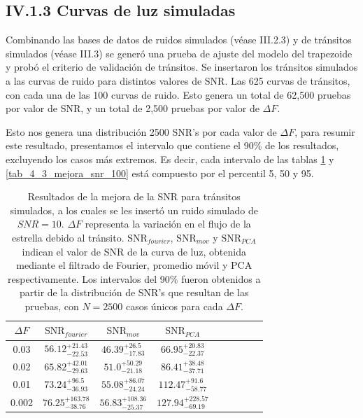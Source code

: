\subsection*{IV.1.3 Curvas de luz simuladas}

Combinando las bases de datos de ruidos simulados (véase III.2.3) y de tránsitos simulados (véase III.3) se generó una prueba de ajuste del modelo del trapezoide y probó el criterio de validación de tránsitos. Se insertaron los tránsitos simulados a las curvas de ruido para distintos valores de SNR. Las 625 curvas de tránsitos, con cada una de las 100 curvas de ruido. Esto genera un total de 62,500 pruebas por valor de SNR, y un total de 2,500 pruebas por valor de $\Delta F$.

Esto nos genera una distribución 2500 SNR's por cada valor de $\Delta F$, para resumir este resultado, presentamos el intervalo que contiene el 90\% de los resultados, excluyendo los casos más extremos. Es decir, cada intervalo de las tablas \ref{tab_4_2_mejora_snr_10} y \ref{tab_4_3_mejora_snr_100} está compuesto por el percentil 5, 50 y 95.  

\begin{table}
	\centering
	\begin{tabular}{ccccccccc}
	\hline 
	$\Delta F$ & $\mbox{SNR}_{fourier}$ &  $\mbox{SNR}_{mov}$ & $\mbox{SNR}_{PCA}$\\ 
	\hline
	0.03 & 	${56.12}_{-22.53}^{+21.43}$ & ${46.39}_{-17.83}^{+26.5}$ & ${66.95}_{-22.37}^{+20.83}$ \\
	0.02 &  ${65.82}_{-29.63}^{+42.01}$ & ${51.0}_{-21.18}^{+50.29}$ & ${86.41}_{-37.71}^{+38.48}$ \\
	0.01 & ${73.24}_{-36.93}^{+96.5}$ & ${55.08}_{-24.24}^{+86.07}$ & ${112.47}_{-58.77}^{+91.6}$ \\
	0.002 & ${76.25}_{-38.76}^{+163.78}$ & ${56.83}_{-25.37}^{+108.36}$	& ${127.94}_{-69.19}^{+228.57}$ \\
	\hline 
	\end{tabular} 
	\caption{Resultados de la mejora de la SNR para tránsitos simulados, a los cuales se les insertó un ruido simulado de $SNR=10$. $\Delta F$ representa la variación en el flujo de la estrella debido al tránsito. $\mbox{SNR}_{fourier}$, $\mbox{SNR}_{mov}$ y $\mbox{SNR}_{PCA}$ indican el valor de SNR de la curva de luz, obtenida mediante el filtrado de Fourier, promedio móvil y PCA respectivamente. Los intervalos del 90\% fueron obtenidos a partir de la distribución de SNR's que resultan de las pruebas, con $N=2500$ casos únicos para cada $\Delta F$.}
	\label{tab_4_2_mejora_snr_10}
	\end{table}



